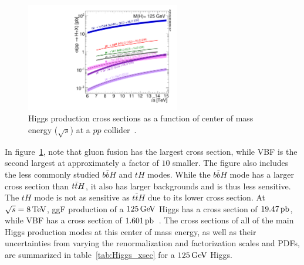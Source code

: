 \begin{figure}[h!]
  \centering
  \captionsetup{justification=centering}

  \includegraphics[width=0.6\textwidth,angle=270]{figures/h125_xsec}
  \caption{Higgs production cross sections as a function of center of mass energy ($\sqrt{s}$) at a $pp$ collider~\cite{LHCXSWG}.}
  \label{fig:Higgs_xsec}
\end{figure}

In figure~\ref{fig:Higgs_xsec}, note that gluon fusion has the largest cross section, while VBF is the second largest at approximately a factor of $10$ smaller. The figure also includes the less commonly studied $b\bar{b}H$ and $tH$ modes. While the $b\bar{b}H$ mode has a larger cross section than $t\bar{t} H$, it also has larger backgrounds and is thus less sensitive. The $tH$ mode is not as sensitive as $t\bar{t}H$ due to its lower cross section. At $\sqrt{s} = 8 \TeV$, ggF production of a $125 \GeV$ Higgs has a cross section of $19.47 \mbox{\,pb}$, while VBF has a cross section of $1.601 \mbox{\,pb}$~\cite{LHCXSWG}. The cross sections of all of the main Higgs production modes at this center of mass energy, as well as their uncertainties from varying the renormalization and factorization scales and PDFs, are summarized in table~\ref{tab:Higgs_xsec} for a $125 \GeV$ Higgs.

